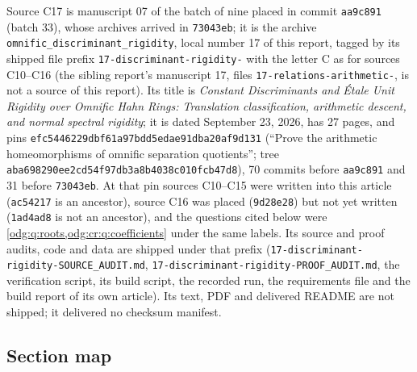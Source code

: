 \documentclass[11pt,oneside]{article}
\numberwithin{equation}{section}
\theoremstyle{definition}
\theoremstyle{remark}
\newcommand{\fn}[1]{\nolinkurl{#1}}
\begin{document}
Source C17 is manuscript 07 of the batch of nine placed in commit \texttt{aa9c891} (batch 33),
whose archives arrived in \texttt{73043eb}; it is the archive
\fn{omnific_discriminant_rigidity}, local number 17 of this report, tagged by its shipped
file prefix \fn{17-discriminant-rigidity-} with the letter C as for sources C10--C16 (the
sibling report's manuscript 17, files \fn{17-relations-arithmetic-}, is not a source of this
report). Its title is \emph{Constant Discriminants and \'Etale Unit Rigidity over Omnific
Hahn Rings: Translation classification, arithmetic descent, and normal spectral rigidity};
it is dated September 23, 2026, has 27 pages, and pins
\nolinkurl{efc5446229dbf61a97bdd5edae91dba20af9d131} (``Prove the arithmetic
homeomorphisms of omnific separation quotients''; tree
\nolinkurl{aba698290ee2cd54f97db3a8b4038c010fcb47d8}), 70 commits before \texttt{aa9c891}
and 31 before \texttt{73043eb}. At that pin sources C10--C15 were written into this article
(\texttt{ac54217} is an ancestor), source C16 was placed (\texttt{9d28e28}) but not yet
written (\texttt{1ad4ad8} is not an ancestor), and the questions cited below were
\cref{odg:q:roots,odg:cr:q:coefficients} under the same labels. Its source and proof audits,
code and data are shipped under that prefix
(\fn{17-discriminant-rigidity-SOURCE_AUDIT.md}, \fn{17-discriminant-rigidity-PROOF_AUDIT.md},
the verification script, its build script, the recorded run, the requirements file and the
build report of its own article). Its text, PDF and delivered README are not shipped; it
delivered no checksum manifest.

\subsection{Section map}
\end{document}
